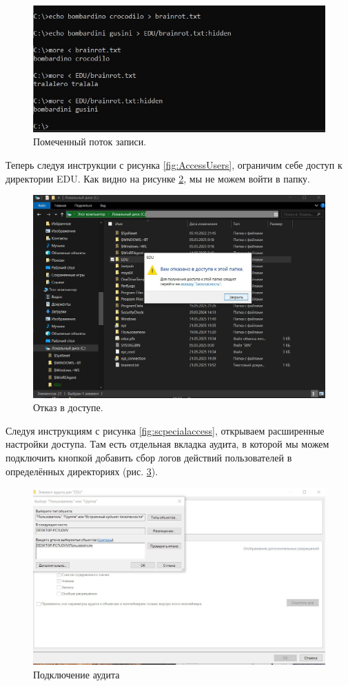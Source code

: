 \begin{figure}
    \centering
    \includegraphics[width=\linewidth]{Pic/lab2/photo_2025-05-21_21-19-28.jpg}
    \caption{Помеченный поток записи.}
    \label{fig:hiddenecho}
\end{figure}
\newpage
Теперь следуя инструкции с рисунка \ref{fig:AccessUsers}, ограничим себе доступ к директории EDU. Как видно на рисунке \ref{fig:DeniedAccess}, мы не можем войти в папку. 
\begin{figure}[h!]
    \centering
    \includegraphics[width=0.5\linewidth]{Pic/lab2/photo_2025-05-21_21-19-31.jpg}
    \caption{Отказ в доступе.}
    \label{fig:DeniedAccess}
\end{figure}

Следуя инструкциям с рисунка \ref{fig:scpecialaccess}, открываем расширенные настройки доступа. Там есть отдельная вкладка аудита, в которой мы можем подключить кнопкой добавить сбор логов действий пользователей в определённых директориях (рис. \ref{fig:audit}). 

\begin{figure}[h!]
    \centering
    \includegraphics[width=0.5\linewidth]{Pic/lab2/photo_2025-05-21_21-19-32.jpg}
    \caption{Подключение аудита}
    \label{fig:audit}
\end{figure}

